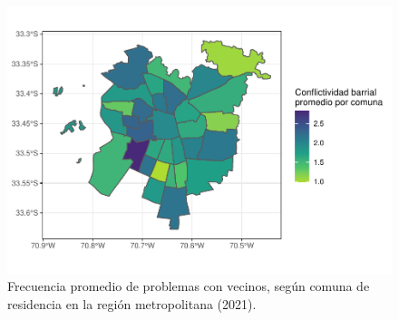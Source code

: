 \documentclass[
  12pt,
]{book}
\begin{document}
\begin{figure}

{\centering \includegraphics{reporte-elsoc_files/figure-latex/confli-comuna-1} 

}

\caption{Frecuencia promedio de problemas con vecinos, según comuna de residencia en la región metropolitana (2021).}\label{fig:confli-comuna}
\end{figure}
\end{document}
